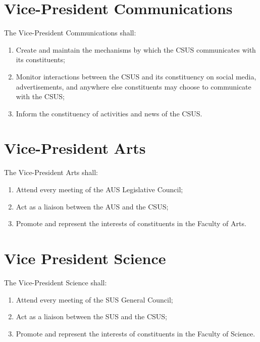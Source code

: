 \section{Vice-President Communications}\label{vice-president-communications}

The Vice-President Communications shall:

\begin{enumerate}
\def\labelenumi{\arabic{enumi}.}
\item
  Create and maintain the mechanisms by which the CSUS communicates with
  its constituents;
\item
  Monitor interactions between the CSUS and its constituency on social
  media, advertisements, and anywhere else constituents may choose to
  communicate with the CSUS;
\item
  Inform the constituency of activities and news of the CSUS.
\end{enumerate}

\section{Vice-President
Arts}\label{vice-president-arts}

The Vice-President Arts shall:

\begin{enumerate}
\def\labelenumi{\arabic{enumi}.}
\item
  Attend every meeting of the AUS Legislative Council;
\item
  Act as a liaison between the AUS and the CSUS;
\item
  Promote and represent the interests of constituents in the Faculty of
  Arts.
\end{enumerate}

\section{Vice President Science}\label{vice-president-science}

The Vice-President Science shall:

\begin{enumerate}
\def\labelenumi{\arabic{enumi}.}
\item
  Attend every meeting of the SUS General Council;
\item
  Act as a liaison between the SUS and the CSUS;
\item
  Promote and represent the interests of constituents in the Faculty of
  Science.
\end{enumerate}

